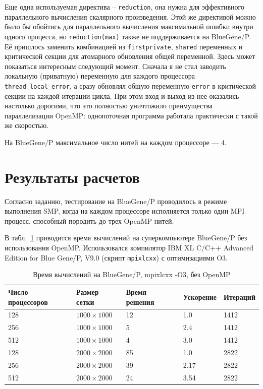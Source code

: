 \documentclass[12pt,notitlepage,oneside]{extarticle}
\begin{document}
Еще одна используемая директива -- \texttt{reduction}, она нужна для
эффективного параллельного вычисления скалярного произведения. Этой же
директивой можно было бы обойтись для параллельного вычисления максимальной
ошибки внутри одного процесса, но \texttt{reduction(max)} также не
поддерживается на BlueGene/P. Её пришлось заменить комбинацией из
\texttt{firstprivate}, \texttt{shared} переменных и критической секции для
атомарного обновления общей переменной. Здесь может показаться интересным
следующий момент. Сначала я не стал заводить локальную (приватную) переменную
для каждого процессора \texttt{thread\_local\_error}, а сразу обновлял общую
переменную \texttt{error} в критической секции на каждой итерации цикла.
При этом вход и выход из нее оказались настолько дорогими, что это полностью
уничтожило преимущества параллелизации OpenMP: однопоточная программа работала
практически с такой же скоростью.

На BlueGene/P максимальное число нитей на каждом процессоре --- 4.

\section{Результаты расчетов}
Согласно заданию, тестирование на BlueGene/P проводилось в режиме выполнения
SMP, когда на каждом процессоре исполняется только один MPI процесс, способный
породить до трех OpenMP нитей.

В табл.~\ref{bg:table} приводится время вычислений на суперкомпьютере BlueGene/P
без использования OpenMP. Использовался компилятор IBM XL C/C++ Advanced Edition
for Blue Gene/P, V9.0 (скрипт \texttt{mpixlcxx}) с оптимизациями O3.

\begin{table}[h]
\centering
\caption{Время вычислений на BlueGene/P, mpixlcxx -O3, без OpenMP}
\label{bg:table}
\begin{tabular}{|l|l|l|l|l|}
\textbf{Число процессоров} & \textbf{Размер сетки} & \textbf{Время решения} & \textbf{Ускорение}      & \textbf{Итераций}        \\ \hline
128                        & $1000 \times 1000 $        & 12                     & 1.0                   & 1412                     \\
256                        & $1000 \times 1000 $        & 5                      & 2.4                   & 1412                         \\
512                        & $1000 \times 1000 $        & 4                      & 3.0                   & 1412                         \\ \hline
128                        & $2000 \times 2000 $        & 85                     & 1.0                   & 2822                     \\
256                        & $2000 \times 2000 $        & 39                     & 2.17                   & 2822                         \\
512                        & $2000 \times 2000 $        & 24                     & 3.54                   & 2822
\end{tabular}
\end{table}
\end{document}
